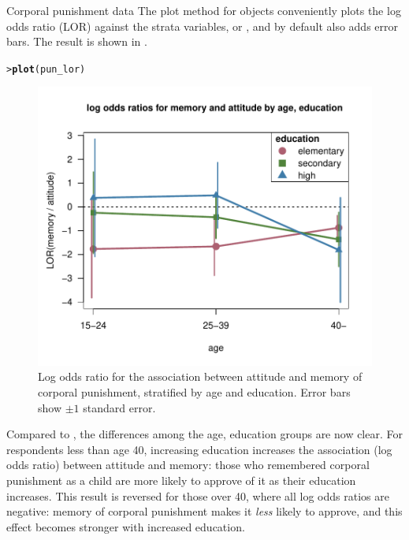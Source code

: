 \documentclass[10pt,krantz2]{krantz}\usepackage[]{graphicx}\usepackage[]{color}
\makeatletter
\newcommand{\hlstd}[1]{\textcolor[rgb]{0.345,0.345,0.345}{#1}}%
\newcommand{\hlkwd}[1]{\textcolor[rgb]{0.737,0.353,0.396}{\textbf{#1}}}%
\newenvironment{kframe}{%
 \def\at@end@of@kframe{}%
 \ifinner\ifhmode%
  \def\at@end@of@kframe{\end{minipage}}%
  \begin{minipage}{\columnwidth}%
 \fi\fi%
 \def\FrameCommand##1{\hskip\@totalleftmargin \hskip-\fboxsep
 \colorbox{shadecolor}{##1}\hskip-\fboxsep
     \hskip-\linewidth \hskip-\@totalleftmargin \hskip\columnwidth}%
 \MakeFramed {\advance\hsize-\width
   \@totalleftmargin\z@ \linewidth\hsize
   \@setminipage}}%
 {\par\unskip\endMakeFramed%
 \at@end@of@kframe}
\newenvironment{knitrout}{}{} %
\renewenvironment{knitrout}{\small\renewcommand{\baselinestretch}{.85}}{} %
\makeatother
\begin{document}
\begin{Example}[punish2]{Corporal punishment data}
The plot method for  objects conveniently plots the log odds ratio (LOR) 
against the strata variables,  or , and by
default also adds error bars. The result is shown in .
\begin{knitrout}
\color{fgcolor}\begin{kframe}
\begin{alltt}
\hlstd{> }\hlkwd{plot}\hlstd{(pun_lor)}
\end{alltt}
\end{kframe}\begin{figure}[!htbp]

\centerline{\includegraphics[width=.8\textwidth]{ch05/fig/pun-lor-plot-1} }

\caption[Log odds ratio for the association between attitude and memory of corporal punishment, stratified by age and education]{Log odds ratio for the association between attitude and memory of corporal punishment, stratified by age and education. Error bars show $\pm 1$ standard error.}\label{fig:pun-lor-plot}
\end{figure}


\end{knitrout}
Compared to , the differences among the age, education groups are now clear.
For respondents less than age 40, increasing education increases the association (log odds ratio) 
between attitude and memory: those who remembered corporal punishment as a child are more likely to
approve of it as their education increases.  This result is reversed for those over 40, where all
log odds ratios are negative: memory of corporal punishment makes it \emph{less} likely to approve,
and this effect becomes stronger with increased education.


\end{Example}
\end{document}
